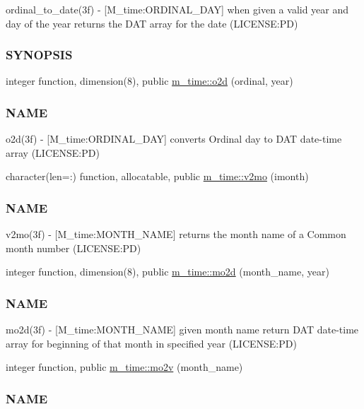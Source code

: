\begin{DoxyCompactItemize}
\begin{DoxyCompactList}
ordinal\+\_\+to\+\_\+date(3f) -\/ \mbox{[}M\+\_\+time\+:O\+R\+D\+I\+N\+A\+L\+\_\+\+D\+AY\mbox{]} when given a valid year and day of the year returns the D\+AT array for the date (L\+I\+C\+E\+N\+SE\+:PD) \subsubsection*{S\+Y\+N\+O\+P\+S\+IS}\end{DoxyCompactList}\item 
integer function, dimension(8), public \mbox{\hyperlink{namespacem__time_a55e2cb9efc9d4d209ae2864f073d4f19}{m\+\_\+time\+::o2d}} (ordinal, year)
\begin{DoxyCompactList}\small\item\em \subsubsection*{N\+A\+ME}

o2d(3f) -\/ \mbox{[}M\+\_\+time\+:O\+R\+D\+I\+N\+A\+L\+\_\+\+D\+AY\mbox{]} converts Ordinal day to D\+AT date-\/time array (L\+I\+C\+E\+N\+SE\+:PD) \end{DoxyCompactList}\item 
character(len=\+:) function, allocatable, public \mbox{\hyperlink{namespacem__time_a6f28cf00e4998bb50bb503f5e4bd3f77}{m\+\_\+time\+::v2mo}} (imonth)
\begin{DoxyCompactList}\small\item\em \subsubsection*{N\+A\+ME}

v2mo(3f) -\/ \mbox{[}M\+\_\+time\+:M\+O\+N\+T\+H\+\_\+\+N\+A\+ME\mbox{]} returns the month name of a Common month number (L\+I\+C\+E\+N\+SE\+:PD) \end{DoxyCompactList}\item 
integer function, dimension(8), public \mbox{\hyperlink{namespacem__time_a8188c7ed4e592c4f2388d28c75486726}{m\+\_\+time\+::mo2d}} (month\+\_\+name, year)
\begin{DoxyCompactList}\small\item\em \subsubsection*{N\+A\+ME}

mo2d(3f) -\/ \mbox{[}M\+\_\+time\+:M\+O\+N\+T\+H\+\_\+\+N\+A\+ME\mbox{]} given month name return D\+AT date-\/time array for beginning of that month in specified year (L\+I\+C\+E\+N\+SE\+:PD) \end{DoxyCompactList}\item 
integer function, public \mbox{\hyperlink{namespacem__time_ad7bf0886754757e8961e562f06cf3bb7}{m\+\_\+time\+::mo2v}} (month\+\_\+name)
\begin{DoxyCompactList}\small\item\em \subsubsection*{N\+A\+ME}


\end{DoxyCompactList}
\end{DoxyCompactItemize}
